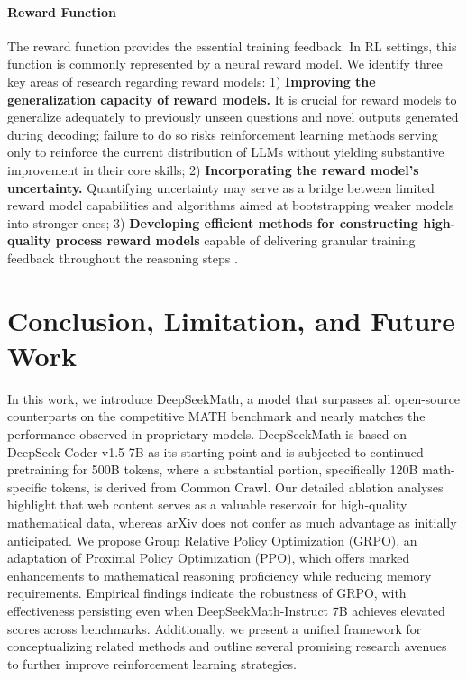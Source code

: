 \begin{itemize}[topsep=0pt]
\begin{itemize}[topsep=0pt]
\paragraph{Reward Function} The reward function provides the essential training feedback. In RL settings, this function is commonly represented by a neural reward model. We identify three key areas of research regarding reward models: 1) \textbf{Improving the generalization capacity of reward models.} It is crucial for reward models to generalize adequately to previously unseen questions and novel outputs generated during decoding; failure to do so risks reinforcement learning methods serving only to reinforce the current distribution of LLMs without yielding substantive improvement in their core skills; 2) \textbf{Incorporating the reward model’s uncertainty.} Quantifying uncertainty may serve as a bridge between limited reward model capabilities and algorithms aimed at bootstrapping weaker models into stronger ones; 3) \textbf{Developing efficient methods for constructing high-quality process reward models} capable of delivering granular training feedback throughout the reasoning steps \citep{lightman2023let,wang2023math}.

\section{Conclusion, Limitation, and Future Work} In this work, we introduce DeepSeekMath, a model that surpasses all open-source counterparts on the competitive MATH benchmark and nearly matches the performance observed in proprietary models. DeepSeekMath is based on DeepSeek-Coder-v1.5 7B as its starting point and is subjected to continued pretraining for 500B tokens, where a substantial portion, specifically 120B math-specific tokens, is derived from Common Crawl. Our detailed ablation analyses highlight that web content serves as a valuable reservoir for high-quality mathematical data, whereas arXiv does not confer as much advantage as initially anticipated. We propose Group Relative Policy Optimization (GRPO), an adaptation of Proximal Policy Optimization (PPO), which offers marked enhancements to mathematical reasoning proficiency while reducing memory requirements. Empirical findings indicate the robustness of GRPO, with effectiveness persisting even when DeepSeekMath-Instruct 7B achieves elevated scores across benchmarks. Additionally, we present a unified framework for conceptualizing related methods and outline several promising research avenues to further improve reinforcement learning strategies.


\end{itemize}
\end{itemize}
